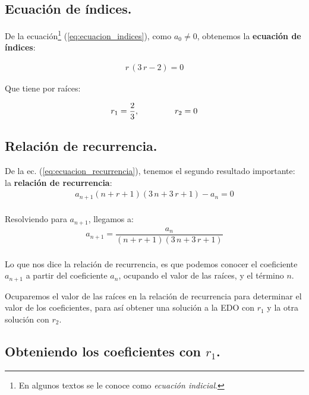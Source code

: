 \subsection*{Ecuación de índices.}

De la ecuación\footnote{En algunos textos se le conoce como \emph{ecuación indicial}.} (\ref{eq:ecuacion_indices}), como $a_{0} \neq 0$, obtenemos la \textbf{ecuación de índices}:

\begin{align*}
r \, (3 \, r - 2) = 0
\end{align*}

Que tiene por raíces:

\begin{align*}
r_{1} = \dfrac{2}{3}, \hspace{1.5cm} r_{2} = 0
\end{align*}

\subsection*{Relación de recurrencia.}

De la ec. (\ref{eq:ecuacion_recurrencia}), tenemos el segundo resultado importante: la \textbf{relación de recurrencia}:
\begin{align*}
a_{n+1} (n + r + 1)(3 \, n + 3 \, r + 1) - a_{n} = 0
\end{align*}
\\
Resolviendo para $a_{n+1}$, llegamos a:
\begin{align}
a_{n+1} = \dfrac{a_{n}}{(n + r + 1)(3 \, n + 3 \, r + 1)}
\label{eq:ecuacion_07}
\end{align}
\\
Lo que nos dice la relación de recurrencia, es que podemos conocer el coeficiente $a_{n+1}$ a partir del coeficiente $a_{n}$, ocupando el valor de las raíces, y el término $n$.
\par
Ocuparemos el valor de las raíces en la relación de recurrencia para determinar el valor de los coeficientes, para así obtener una solución a la EDO con $r_{1}$ y la otra solución con $r_{2}$.

\subsection*{Obteniendo los coeficientes con $r_{1}$.}

